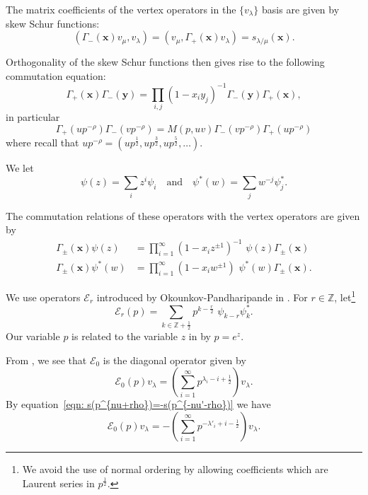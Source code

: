 \documentclass[12pt]{amsart}
\newcommand{\znums} {{\mathbb Z}}		%
\newcommand{\half}{\frac{1}{2}}
\theoremstyle{definition}
\newcommand{\ZplusHalf}{\znums+{ \half}}
\newcommand{\E}{\mathcal{E}}
\newcommand{\ptotheminusrho}{p^{-\rho}}
\begin{document}
The matrix coefficients of the vertex operators in the $\{v_{\lambda}
\}$ basis are given by skew Schur functions:
\begin{equation}\label{eqn: matrix coefs of vertex ops are skew schur}
(\Gamma_{-}(\mathbf{x})v_{\mu},v_{\lambda}) =
(v_{\mu},\Gamma_{+}(\mathbf{x})v_{\lambda}) = s_{\lambda
/\mu}(\mathbf{x}).
\end{equation}

Orthogonality of the skew Schur functions then gives rise to the
following commutation equation:
\[
\Gamma_{+}(\mathbf{x})\Gamma_{-}(\mathbf{y}) = \prod_{i,j}
(1-x_{i}y_{j})^{-1} \Gamma_{-}(\mathbf{y})\Gamma_{+}(\mathbf{x}),
\]
in particular
\begin{equation}\label{eqn: Gamma+Gamma- commutation relation}
\Gamma_{+}(u\ptotheminusrho )\Gamma_{-}(v\ptotheminusrho ) =M(p,uv)
\Gamma_{-}(v\ptotheminusrho )\Gamma_{+}(u\ptotheminusrho )
\end{equation}
where recall that $u\ptotheminusrho  = (up^{\frac{1}{2}},up^{\frac{3}{2}},up^{\frac{5}{2}},\dots )$.

We let
\[
\psi (z) = \sum_{i} z^{i}\psi_{i}\quad \text{and}\quad \psi^{*}(w) =
\sum_{j} w^{-j} \psi_{j}^{*}. 
\]

The commutation relations of these operators with the vertex operators
are given by
\begin{align}\label{eqn: commutation of Gamma(x) with psi(z) and psi*(w)}
\Gamma_{\pm}(\mathbf{x})\psi (z) &= \prod_{i=1}^{\infty}
(1-x_{i}z^{\pm 1})^{-1} \,\, \psi (z)\Gamma_{\pm}(\mathbf{x})\\
\Gamma_{\pm}(\mathbf{x})\psi^{*} (w) &= \prod_{i=1}^{\infty}
(1-x_{i}w^{\pm 1}) \,\,\psi^{*}(w)\Gamma_{\pm}(\mathbf{x}).\nonumber
\end{align}


We use operators $\E_{r}$ introduced by Okounkov-Pandharipande in
\cite[\S~2.2.4]{Okounkov-Pandharipande-completed-cycles}.  For $r\in
\znums$, let\footnote{We avoid the use of normal ordering by allowing
coefficients which are Laurent series in $p^{\half}$.}
\[
\E_{r}(p) = \sum_{k\in \ZplusHalf} p^{k-\frac{r}{2}}\,\, \psi_{k-r}\psi^{*}_{k}.
\]
Our variable $p$ is related to the variable $z$ in
\cite{Okounkov-Pandharipande-completed-cycles} by $p=e^{z}.$


From \cite[Eqns~2.9 and 0.18]{Okounkov-Pandharipande-completed-cycles}, we
see that $\E_{0}$ is the diagonal operator given by
\[
\E _0 (p) v_{\lambda} = \left(\sum_{i=1}^{\infty}
p^{\lambda_{i}-i+\half} \right)v_{\lambda}. 
\]
By equation~\eqref{eqn: s(p^{nu+rho})=-s(p^{-nu'-rho})} we have
\begin{equation}\label{eqn: formula for the operator E0}
\E _0 (p) v_{\lambda} = -\left(\sum_{i=1}^{\infty}
p^{-\lambda'_{i}+i-\half} \right)v_{\lambda}. 
\end{equation}
\end{document}
